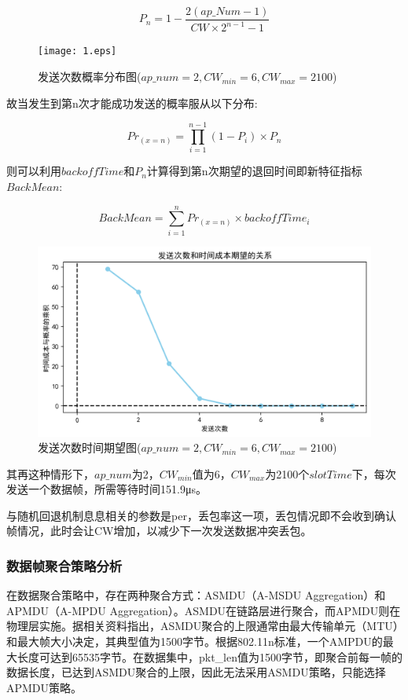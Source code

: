 \documentclass[bwprint]{gmcmthesis}
\begin{document}
\begin{equation}
	P_{n}=1-\frac{2(ap\_Num-1)}{CW\times 2^{n-1}-1}
\end{equation}

\begin{figure}[H]
	\centering
	\texttt{[image: 1.eps]}
	\caption{发送次数概率分布图($ap\_num=2,CW_{min}=6,CW_{max}=2100$)}
	\label{figure1}
\end{figure}


故当发生到第n次才能成功发送的概率服从以下分布:

\begin{equation}
	Pr_{(x=n)}=\prod_{i=1}^{n-1}{\left( 1-P_i \right) \times}P_n
\end{equation}

则可以利用$backoffTime$和$P_n$计算得到第n次期望的退回时间即新特征指标$BackMean$:

\begin{equation}
	BackMean=\sum_{i=1}^n{Pr_{(x=n)}\times backoffTime_i}
\end{equation}

\begin{figure}[H]
	\centering
	\includegraphics[width=0.75\linewidth]{figures/3}
	\caption{发送次数时间期望图($ap\_num=2,CW_{min}=6,CW_{max}=2100$)}
	\label{figure3}
\end{figure}

其再这种情形下，$ap\_num$为2，$CW_{min}$值为6，$CW_{max}$为2100个$slotTime$下，每次发送一个数据帧，所需等待时间151.9μs。

与随机回退机制息息相关的参数是per，丢包率这一项，丢包情况即不会收到确认帧情况，此时会让CW增加，以减少下一次发送数据冲突丢包。

\subsubsection{数据帧聚合策略分析}

在数据聚合策略中，存在两种聚合方式：ASMDU（A-MSDU Aggregation）和APMDU（A-MPDU Aggregation）。ASMDU在链路层进行聚合，而APMDU则在物理层实施。据相关资料指出，ASMDU聚合的上限通常由最大传输单元（MTU）和最大帧大小决定，其典型值为1500字节。根据802.11n标准，一个AMPDU的最大长度可达到65535字节。在数据集中，pkt\_len值为1500字节，即聚合前每一帧的数据长度，已达到ASMDU聚合的上限，因此无法采用ASMDU策略，只能选择APMDU策略。
\end{document}
